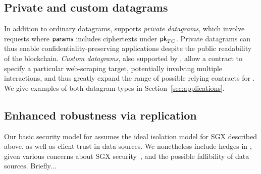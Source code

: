 \subsection{Private and custom datagrams}
\label{subsec:private_datagrams}
In addition to ordinary datagrams, \tc supports \emph{private datagrams}, which involve requests where ${\sf params}$ includes ciphertexts under ${\sf pk}_{TC}$. Private datagrams can thus enable confidentiality-preserving applications despite the public readability of the blockchain.  \emph{Custom datagrams}, also supported by \tc, allow a contract to specify a particular web-scraping target, potentially involving multiple interactions, and thus greatly expand the range of possible relying contracts for \tc. We give examples of both datagram types in Section~\ref{sec:applications}.

\subsection{Enhanced robustness via replication}
\label{subsec:enhanced_robustness}
Our basic security model for \tc assumes the ideal isolation model for SGX described above, as well as client trust in data sources. We nonetheless include hedges in \tc, given various concerns about SGX security~\cite{sgxexplained,7163052}, and the possible fallibility of data sources. Briefly...


